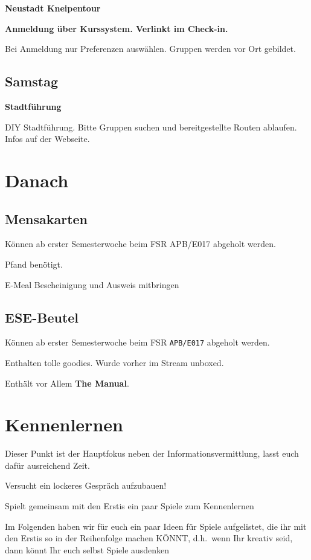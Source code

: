 \documentclass[a4paper,12pt]{scrreprt}
\begin{document}
\textbf{Neustadt Kneipentour}
\begin{itemize*}
    \item \textbf{Anmeldung über Kurssystem. Verlinkt im Check-in.}
    \item Bei Anmeldung nur Preferenzen auswählen. Gruppen werden vor Ort gebildet.
\end{itemize*}


\subsection{Samstag}

\textbf{Stadtführung}
\begin{itemize*}
    \item DIY Stadtführung. Bitte Gruppen suchen und bereitgestellte Routen ablaufen. Infos auf der Webseite.
\end{itemize*}

\section{Danach}
\subsection{Mensakarten}
\begin{itemize*}
    \item Können ab erster Semesterwoche beim FSR APB/E017 abgeholt werden.
    \item {} Pfand benötigt.
    \item E-Meal Bescheinigung und Ausweis mitbringen
\end{itemize*}

\subsection{ESE-Beutel}
\begin{itemize*}
    \item Können ab erster Semesterwoche beim FSR \texttt{APB/E017} abgeholt werden.
    \item Enthalten tolle goodies. Wurde vorher im Stream unboxed.
    \item Enthält vor Allem \textbf{The Manual}.
\end{itemize*}


\section{Kennenlernen}
\begin{itemize*}
    \item Dieser Punkt ist der Hauptfokus neben der Informationsvermittlung, lasst euch dafür ausreichend Zeit.
    \item Versucht ein lockeres Gespräch aufzubauen!
    \item Spielt gemeinsam mit den Erstis ein paar Spiele zum Kennenlernen
    \item Im Folgenden haben wir für euch ein paar Ideen für Spiele aufgelistet, die ihr mit den Erstis so in der Reihenfolge machen KÖNNT, d.h.\ wenn Ihr kreativ seid, dann könnt Ihr euch selbst Spiele ausdenken
\end{itemize*}
\end{document}
